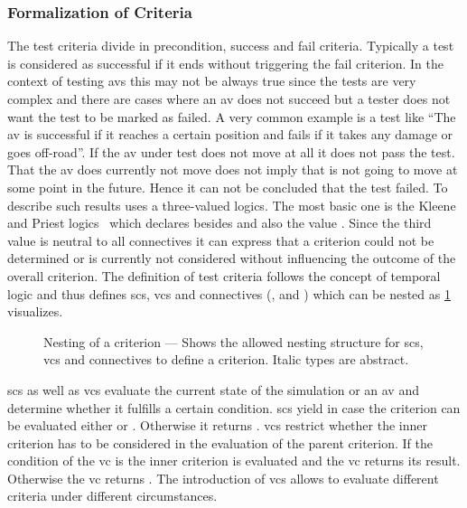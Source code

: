 \subsubsection{Formalization of Criteria}
The test criteria divide in precondition, success and fail criteria.
Typically a test is considered as successful if it ends without triggering the fail criterion.
In the context of testing \glspl{av} this may not be always true since the tests are very complex and there are cases where an \gls{av} does not succeed but a tester does not want the test to be marked as failed.
A very common example is a test like \enquote{The \gls{av} is successful if it reaches a certain position and fails if it takes any damage or goes off-road}.
If the \gls{av} under test does not move at all it does not pass the test.
That the \gls{av} does currently not move does not imply that is not going to move at some point in the future.
Hence it can not be concluded that the test failed.
To describe such results \drivebuild{} uses a three-valued logics.
The most basic one is the Kleene and Priest logics~\cite{kleeneLogics} which declares besides \iltrue{} and \ilfalse{} also the value \ilunknown{}.
Since the third value \ilunknown{} is neutral to all connectives it can express that a criterion could not be determined or is currently not considered without influencing the outcome of the overall criterion.
The definition of test criteria follows the concept of temporal logic and thus defines \glspl{sc}, \glspl{vc} and connectives (\iland{}, \ilor{} and \ilnot{}) which can be nested as \cref{fig:nesting} visualizes.
\begin{figure}
    \centering
    
    \medskip
    \caption{%
        Nesting of a criterion --- Shows the allowed nesting structure for \glspl{sc}, \glspl{vc} and connectives to define a criterion. Italic types are abstract.
    }\label{fig:nesting}
\end{figure}
\Glspl{sc} as well as \glspl{vc} evaluate the current state of the simulation or an \gls{av} and determine whether it fulfills a certain condition.
\Glspl{sc} yield in case the criterion can be evaluated either \iltrue{} or \ilfalse{}.
Otherwise it returns \ilunknown{}.
\Glspl{vc} restrict whether the inner criterion has to be considered in the evaluation of the parent criterion.
If the condition of the \gls{vc} is \iltrue{} the inner criterion is evaluated and the \gls{vc} returns its result.
Otherwise the \gls{vc} returns \ilunknown{}.
The introduction of \glspl{vc} allows to evaluate different criteria under different circumstances.
